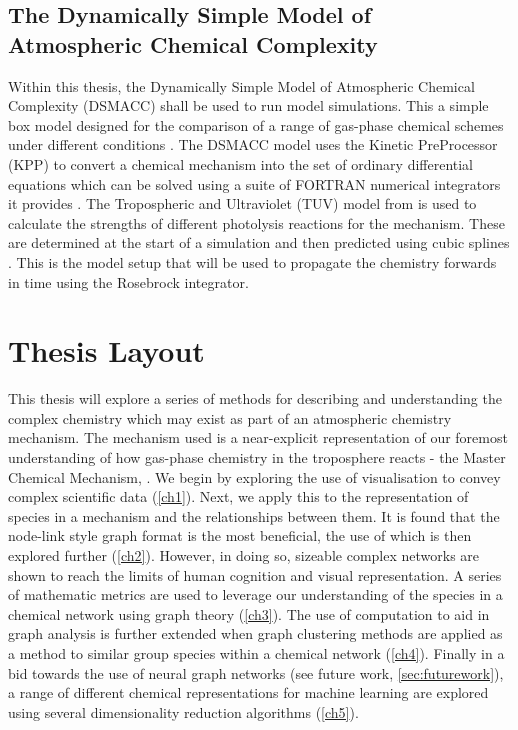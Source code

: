 \subsection{The Dynamically Simple Model of Atmospheric Chemical Complexity}

Within this thesis, the Dynamically Simple Model of Atmospheric Chemical Complexity (DSMACC) shall be used to run model simulations. This a simple box model designed for the comparison of a range of gas-phase chemical schemes under different conditions \citep{dsmacc}.
 The DSMACC model uses the Kinetic PreProcessor (KPP) to convert a chemical mechanism into the set of ordinary differential equations which can be solved using a suite of FORTRAN numerical integrators it provides \citep{kpp}. The Tropospheric and Ultraviolet (TUV) model from \cite{tuv} is used to calculate the strengths of different photolysis reactions for the mechanism. These are determined at the start of a simulation and then predicted using cubic splines \citep{dsmaccgit}. This is the model setup that will be used to propagate the chemistry forwards in time using the Rosebrock integrator. 






\section{Thesis Layout}
This thesis will explore a series of methods for describing and understanding the complex chemistry which may exist as part of an atmospheric chemistry mechanism. The mechanism used is a near-explicit representation of our foremost understanding of how gas-phase chemistry in the troposphere reacts - the Master Chemical Mechanism, \citep{mcm}.
We begin by exploring the use of visualisation to convey complex scientific data (\autoref{ch1}). Next, we apply this to the representation of species in a mechanism and the relationships between them. It is found that the node-link style graph format is the most beneficial, the use of which is then explored further (\autoref{ch2}).
However, in doing so, sizeable complex networks are shown to reach the limits of human cognition and visual representation. A series of mathematic metrics are used to leverage our understanding of the species in a chemical network using graph theory (\autoref{ch3}). The use of computation to aid in graph analysis is further extended when graph clustering methods are applied as a method to similar group species within a chemical network (\autoref{ch4}). Finally in a bid towards the use of neural graph networks (see future work, \autoref{sec:futurework}), a range of different chemical representations for machine learning are explored using several dimensionality reduction algorithms (\autoref{ch5}).

